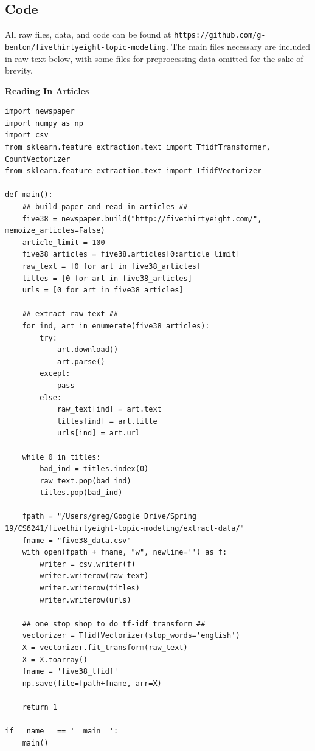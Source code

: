 \documentclass[12pt]{article}
\begin{document}
\newpage
\subsection*{Code}

All raw files, data, and code can be found at \verb|https://github.com/g-benton/fivethirtyeight-topic-modeling|. The main files necessary are included in raw text below, with some files for preprocessing data omitted for the sake of brevity.

\lstset{language=Python}
\textbf{Reading In Articles}
\footnotesize
\begin{lstlisting}
import newspaper
import numpy as np
import csv
from sklearn.feature_extraction.text import TfidfTransformer, CountVectorizer
from sklearn.feature_extraction.text import TfidfVectorizer

def main():
    ## build paper and read in articles ##
    five38 = newspaper.build("http://fivethirtyeight.com/", memoize_articles=False)
    article_limit = 100
    five38_articles = five38.articles[0:article_limit]
    raw_text = [0 for art in five38_articles]
    titles = [0 for art in five38_articles]
    urls = [0 for art in five38_articles]

    ## extract raw text ##
    for ind, art in enumerate(five38_articles):
        try:
            art.download()
            art.parse()
        except:
            pass
        else:
            raw_text[ind] = art.text
            titles[ind] = art.title
            urls[ind] = art.url

    while 0 in titles:
        bad_ind = titles.index(0)
        raw_text.pop(bad_ind)
        titles.pop(bad_ind)

    fpath = "/Users/greg/Google Drive/Spring 19/CS6241/fivethirtyeight-topic-modeling/extract-data/"
    fname = "five38_data.csv"
    with open(fpath + fname, "w", newline='') as f:
        writer = csv.writer(f)
        writer.writerow(raw_text)
        writer.writerow(titles)
        writer.writerow(urls)

    ## one stop shop to do tf-idf transform ##
    vectorizer = TfidfVectorizer(stop_words='english')
    X = vectorizer.fit_transform(raw_text)
    X = X.toarray()
    fname = 'five38_tfidf'
    np.save(file=fpath+fname, arr=X)

    return 1

if __name__ == '__main__':
    main()
\end{lstlisting}
\end{document}
